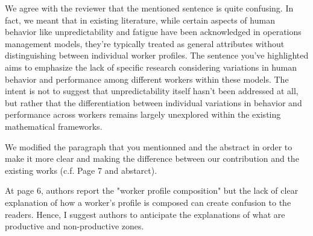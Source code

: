 \documentclass[preprint,11pt,3p]{elsarticle}
\begin{document}
\begin{tcolorbox}[colback=r_color1,colframe=r_color2,title=Response Q3  :]
	We agree with the reviewer that the mentioned sentence is quite confusing. 	
	In fact, we meant that in existing literature, while certain aspects of human behavior like unpredictability and fatigue have been acknowledged in operations management models, they're typically treated as general attributes without distinguishing between individual worker profiles. The sentence you've highlighted aims to emphasize the lack of specific research considering variations in human behavior and performance among different workers within these models. The intent is not to suggest that unpredictability itself hasn't been addressed at all, but rather that the differentiation between individual variations in behavior and performance across workers remains largely unexplored within the existing mathematical frameworks.
	    
	We modified the paragraph that you mentionned  and the abstract in order to make it more clear and making the difference between our contribution and the existing works (c.f. Page 7 and abstarct).  
\end{tcolorbox}
\begin{tcolorbox}[colback=q_color1,colframe=q_color2,title=Q4  :]	
	  At page 6, authors report the "worker profile composition" but the lack of clear explanation of how a worker's profile is composed can create confusion to the readers. Hence, I suggest authors to anticipate the explanations of what are productive and non-productive zones.
\end{tcolorbox}
\end{document}
